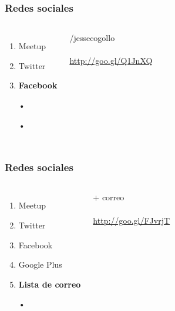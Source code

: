 \documentclass{beamer}
\begin{document}
\begin{frame}
\frametitle{Redes sociales}
\begin{columns}[c] %

\begin{enumerate}
\item Meetup
\item Twitter
\item \textbf{Facebook}
\item[•]
\item[•]
\end{enumerate}

{\color{blue}/jessecogollo}
\\~\\
{\color{blue}\url{http://goo.gl/Q1JnXQ}}
\end{columns}
\end{frame}
\begin{frame}
\frametitle{Redes sociales}
\begin{columns}[c] %

\begin{enumerate}
\item Meetup
\item Twitter
\item Facebook
\item Google Plus
\item \textbf{Lista de correo}
\item[•]
\end{enumerate}

{\color{blue}+ correo}
\\~\\
{\color{blue}\url{http://goo.gl/FJvrjT}}
\end{columns}
\end{frame}
\end{document}
